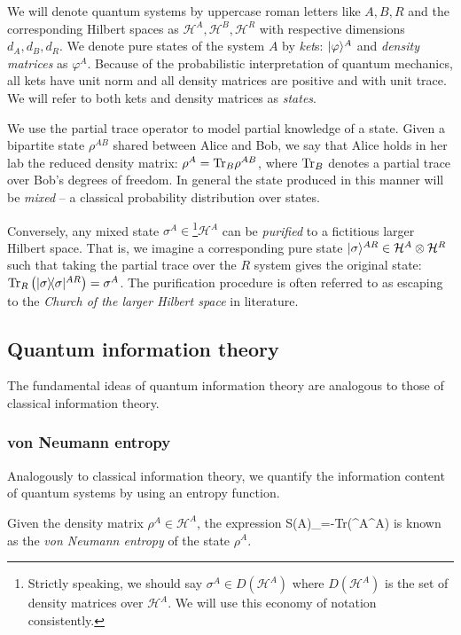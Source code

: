\documentclass[aps,11pt,twoside,letterpaper]{article}
\def\Tr{\textup{Tr}}
\def\ph{\varphi}
\def\cH{\mathcal{H}}
\begin{document}
			We will denote quantum systems by uppercase roman letters like $A,B,R$ and the corresponding 
			Hilbert spaces as $\cH^A, \cH^B, \cH^R$ with respective dimensions $d_A,d_B,d_R$.
		    We denote pure states of the system $A$ by \emph{ket}s: $\ket{\ph}^A$
		    and \emph{density matrices} as $\ph^A$.		%
			Because of the probabilistic interpretation of quantum mechanics, all kets have unit norm and all
			density matrices are positive and with unit trace.
		    We will refer to both kets and density matrices as \emph{states}.
		    
			We use the partial trace operator to model partial knowledge of a state.
			Given a bipartite state $\rho^{AB}$ shared between Alice and Bob, we say that Alice holds in her lab
			the reduced density matrix: $\rho^A = \Tr_B\rho^{AB}$, where $\Tr_B$ denotes a partial trace over 
			Bob's degrees of freedom.
			In general the state produced in this manner will be \emph{mixed} -- a classical probability distribution
			over states.
			
			Conversely, any mixed state $\sigma^A \in$\footnote{Strictly speaking, we should say 
			$\sigma^A \in D(\cH^A)$ where $D(\cH^A)$ is the set of density matrices over $\cH^A$. 
			We will use this economy of notation consistently.}$\cH^A$
			 can be \emph{purified} to a fictitious 
			larger Hilbert space. 
			That is, we imagine a corresponding pure state $\ket{\sigma}^{AR} \in \cH^A \otimes \cH^R$
			such that taking the partial trace over the $R$ system gives the original state: 
			$\Tr_R\left(\proj{\sigma}^{AR}\right)=\sigma^A$. 
			The purification procedure is often referred to as escaping to the \emph{Church of the larger
			Hilbert space} in literature.

		
	\subsection{Quantum information theory}
		The fundamental ideas of quantum information theory are analogous to those of classical information theory. 
		\subsubsection{von Neumann entropy}
		
			Analogously to classical information theory, we quantify the information content of quantum systems 
			by using an entropy function.
			
			\begin{definition} 
				Given the density matrix $\rho^A \in \cH^A$, the expression
				\be
					S(A)_\rho=-\Tr\left(\rho^A\log\rho^A\right)
				\ee
				is known as the \emph{von Neumann entropy} of the state $\rho^A$. 
			\end{definition}
		
\end{document}
